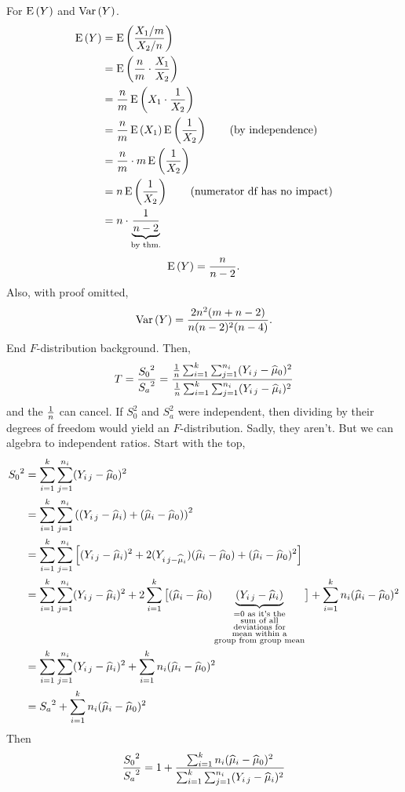 \nl For $\E{Y}$ and $\Var{Y}$.
\begin{align*}
    \E{Y} &= \E{ \frac{X_1/m}{X_2/n}}\\
    &= \E{\frac{n}{m}\cdot \frac{X_1}{X_2}}\\
    &= \frac{n}{m} \E{X_1 \cdot \over{X_2}}\\
    &= \frac{n}{m} \E{X_1} \E{\over{X_2}} \tag{by independence}\\
    &= \frac{n}{m} \cdot m \E{\over{X_2}}\\
    &= n \E{\over{X_2}} \tag{numerator df has no impact}\\
    &= n \cdot \underbrace{\over{n-2}}_{\text{by thm.}}
\end{align*}
$$\E{Y} = \frac{n}{n-2}.$$
Also, with proof omitted,
$$\Var{Y} = \frac{2n^2 (m+n-2)}{n(n-2)^2(n-4)}.$$
End $F$-distribution background. Then,
$$T = \frac{{S_0}^2}{{S_a}^2} = \frac{
    \over{n} \sum_{i=1}^k \sum_{j=1}^{n_i} (Y_{i\,j} - \muh_0)^2
}{  \over{n} \sum_{i=1}^k \sum_{j=1}^{n_i} (Y_{i\,j} - \muh_i)^2}$$
and the $\over{n}$ can cancel. If $S_0^2$ and $S_a^2$ were independent, then dividing by their degrees of freedom would yield an $F$-distribution. Sadly, they aren't. But we can algebra to independent ratios. Start with the top,
\begin{align*}
    {S_0}^2 &=  \sum_{i=1}^k\sum_{j=1}^{n_i} (Y_{i\,j} - \muh_0)^2\\
    &= \sum_{i=1}^k \sum_{j=1}^{n_i} \pars{(Y_{i\,j} - \muh_i) + (\muh_i - \muh_0)}^2\\
    &= \sum_{i=1}^k \sum_{j=1}^{n_i} \brac {
        (Y_{i\,j} - \muh_i)^2 + 2(Y_{i\,j- \muh_i})(\muh_i - \muh_0) + (\muh_i - \muh_0)^2
    }\\
    &=  \sum_{i=1}^k \sum_{j=1}^{n_i} (Y_{i\,j} - \muh_i)^2 + 2 \sum_{i=1}^k \bigbrac{
        (\muh_i - \muh_0) \underbrace{
            (Y_{i\,j} - \muh_i)
        }_{
            \substack{= 0\text{ as it's the} \\ \text{sum of all} \\ \text{deviations for} \\ \text{mean within a} \\ \text{group from group mean}}
        }
    } + \sum_{i=1}^k n_i( \muh_i - \muh_0 )^2\\
    &= \sum_{i=1}^k \sum_{j=1}^{n_i} (Y_{i\,j} - \muh_i)^2 + \sum_{i=1}^k n_i( \muh_i - \muh_0 )^2\\
    &= {S_a}^2 +  \sum_{i=1}^k n_i( \muh_i - \muh_0 )^2
\end{align*}
Then
$$\frac{{S_0}^2}{{S_a}^2} = 1 + \frac{
    \sum_{i=1}^k n_i (\widehat{\mu}_i - \widehat{\mu}_0)^2
}{
    \sum_{i=1}^k \sum_{j=1}^{n_i} (Y_{i\,j} - \widehat{\mu}_i)^2
}$$
